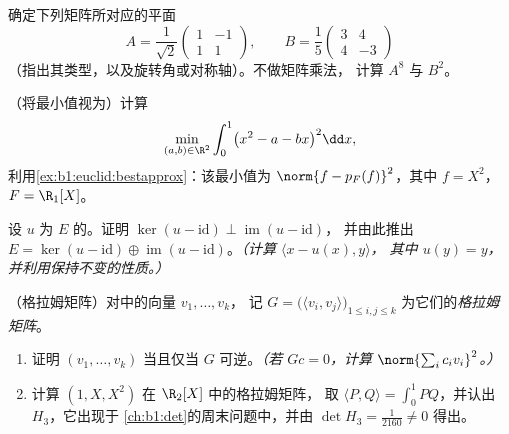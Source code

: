 \begin{exercise}[$\star\star$]\label{exo:b1:euclid:8}
确定下列矩阵所对应的平面
\[
A = \frac{1}{\sqrt 2}\begin{pmatrix} 1 & -1\\ 1 & 1\end{pmatrix},
\qquad
B = \frac{1}{5}\begin{pmatrix} 3 & 4\\ 4 & -3\end{pmatrix}
\]
（指出其类型，以及旋转角或对称轴）。不做矩阵乘法，
计算 $A^8$ 与 $B^2$。
\end{exercise}

\begin{exercise}[$\star\star\star$]\label{exo:b1:euclid:9}
（将最小值视为）计算
\[
\min_{(a, b) \in \R^2} \int_0^1 \bigl(x^2 - a - bx\bigr)^2 \dd x ,
\]
利用\cref{ex:b1:euclid:bestapprox}：该最小值为 $\norm{f -
p_F(f)}^2$，其中 $f = X^2$，$F = \R_1[X]$。
\end{exercise}

\begin{exercise}[$\star\star\star$]\label{exo:b1:euclid:10}
设 $u$ 为 $E$ 的。证明
$\ker(u - \mathrm{id}) \perp \operatorname{im}(u - \mathrm{id})$，
并由此推出 $E = \ker(u - \mathrm{id}) \oplus \operatorname{im}(u -
\mathrm{id})$。\emph{（计算 $\langle x - u(x), y\rangle$，
其中 $u(y) = y$，并利用保持不变的性质。）}
\end{exercise}

\begin{exercise}[$\star\star$]\label{exo:b1:euclid:11}
（格拉姆矩阵）对中的向量 $v_1, \dots, v_k$，
记 $G = \bigl(\langle v_i, v_j\rangle\bigr)_{1 \leq i, j
\leq k}$ 为它们的\emph{格拉姆矩阵}。
\begin{enumerate}
  \item 证明 $(v_1, \dots, v_k)$ 当且仅当
        $G$ 可逆。\emph{（若 $Gc = 0$，计算
        $\norm{\sum_i c_i v_i}^2$。）}
  \item 计算 $(1, X, X^2)$ 在 $\R_2[X]$ 中的格拉姆矩阵，
        取 $\langle P, Q\rangle = \int_0^1 PQ$，并认出
         $H_3$，它出现于
        \cref{ch:b1:det}的周末问题中，并由 $\det H_3 =
        \frac1{2160} \neq 0$ 得出。
\end{enumerate}
\end{exercise}

